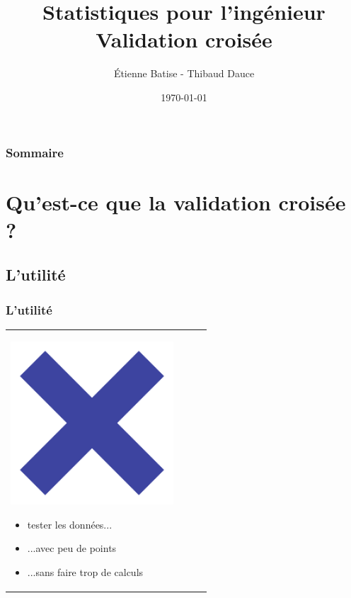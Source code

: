 \documentclass[handout]{beamer}
\title[Stats]{
	Statistiques pour l'ingénieur\\
	Validation croisée
}
\author{
	Étienne Batise - Thibaud Dauce
}
\date{\today}
\begin{document}
	
	\begin{frame}[plain]
		\titlepage
	\end{frame}

	\begin{frame}[plain]
		\frametitle{Sommaire}
		\tableofcontents
	\end{frame}


	\section{Qu'est-ce que la validation croisée ?}

	\subsection{L'utilité}
		\begin{frame}
		\frametitle{L'utilité}
		\begin{tabular}{l l}
			\begin{minipage}{0.2\textwidth}
				\begin{center}
					\includegraphics[width=0.9\textwidth]{images/cross.png}
				\end{center}
			\end{minipage}

			\begin{minipage}{0.8\textwidth}
				\begin{itemize}
					\item tester les données...
					\item ...avec peu de points
					\item ...sans faire trop de calculs
				\end{itemize}
			\end{minipage}

		\end{tabular}
		\end{frame}
\end{document}
